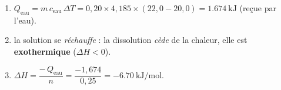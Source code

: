 \documentclass[11pt,a4paper]{article}
\begin{document}
\begin{corrige}
\begin{enumerate}[label=\alph*)]
  \item $Q_{\text{eau}} = m\,c_{\text{eau}}\,\Delta T = 0{,}20\times 4{,}185\times(22{,}0-20{,}0) = \qty{1.674}{\kilo\joule}$ (reçue par l'eau).
  \item la solution se \emph{réchauffe} : la dissolution \emph{cède} de la chaleur, elle est \textbf{exothermique} ($\Delta H<0$).
  \item $\Delta H = \dfrac{-\,Q_{\text{eau}}}{n} = \dfrac{-1{,}674}{0{,}25} = \qty{-6.70}{\kilo\joule\per\mol}$.
\end{enumerate}
\end{corrige}
\end{document}
